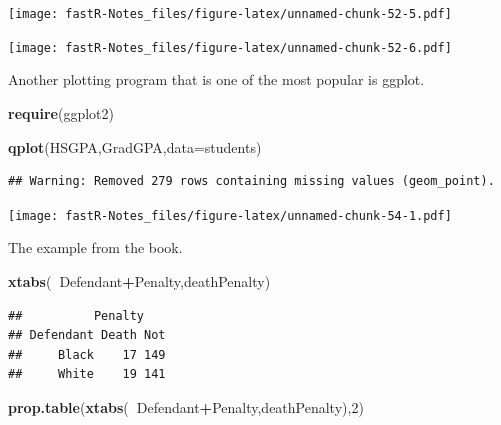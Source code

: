 \documentclass[]{book}
\newenvironment{Shaded}{\begin{snugshade}}{\end{snugshade}}
\newcommand{\KeywordTok}[1]{\textcolor[rgb]{0.13,0.29,0.53}{\textbf{#1}}}
\newcommand{\DataTypeTok}[1]{\textcolor[rgb]{0.13,0.29,0.53}{#1}}
\newcommand{\DecValTok}[1]{\textcolor[rgb]{0.00,0.00,0.81}{#1}}
\newcommand{\OperatorTok}[1]{\textcolor[rgb]{0.81,0.36,0.00}{\textbf{#1}}}
\newcommand{\NormalTok}[1]{#1}
\theoremstyle{definition}
\theoremstyle{definition}
\theoremstyle{definition}
\theoremstyle{remark}
\begin{document}
\texttt{[image: fastR-Notes\_files/figure-latex/unnamed-chunk-52-5.pdf]}

\begin{Shaded}
\end{Shaded}

\texttt{[image: fastR-Notes\_files/figure-latex/unnamed-chunk-52-6.pdf]}

Another plotting program that is one of the most popular is ggplot.

\begin{Shaded}
\begin{Highlighting}[]
\KeywordTok{require}\NormalTok{(ggplot2)}
\end{Highlighting}
\end{Shaded}

\begin{Shaded}
\begin{Highlighting}[]
\KeywordTok{qplot}\NormalTok{(HSGPA,GradGPA,}\DataTypeTok{data=}\NormalTok{students)}
\end{Highlighting}
\end{Shaded}

\begin{verbatim}
## Warning: Removed 279 rows containing missing values (geom_point).
\end{verbatim}

\texttt{[image: fastR-Notes\_files/figure-latex/unnamed-chunk-54-1.pdf]}

The example from the book.

\begin{Shaded}
\begin{Highlighting}[]
\KeywordTok{xtabs}\NormalTok{(}\OperatorTok{~}\NormalTok{Defendant}\OperatorTok{+}\NormalTok{Penalty,deathPenalty)}
\end{Highlighting}
\end{Shaded}

\begin{verbatim}
##          Penalty
## Defendant Death Not
##     Black    17 149
##     White    19 141
\end{verbatim}

\begin{Shaded}
\begin{Highlighting}[]
\KeywordTok{prop.table}\NormalTok{(}\KeywordTok{xtabs}\NormalTok{(}\OperatorTok{~}\NormalTok{Defendant}\OperatorTok{+}\NormalTok{Penalty,deathPenalty),}\DecValTok{2}\NormalTok{)}
\end{Highlighting}
\end{Shaded}
\end{document}
